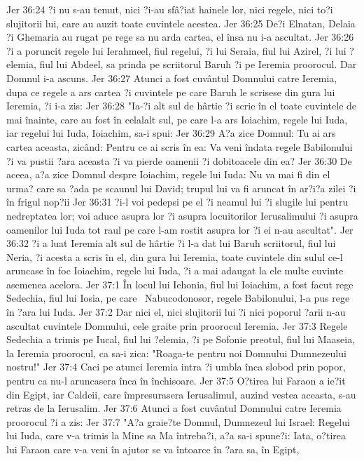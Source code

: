 Jer 36:24  ?i nu s-au temut, nici ?i-au sfâ?iat hainele lor, nici regele, nici to?i slujitorii lui, care au auzit toate cuvintele acestea.
Jer 36:25  De?i Elnatan, Delaia ?i Ghemaria au rugat pe rege sa nu arda cartea, el însa nu i-a ascultat.
Jer 36:26  ?i a poruncit regele lui Ierahmeel, fiul regelui, ?i lui Seraia, fiul lui Azirel, ?i lui ?elemia, fiul lui Abdeel, sa prinda pe scriitorul Baruh ?i pe Ieremia proorocul. Dar Domnul i-a ascuns.
Jer 36:27  Atunci a fost cuvântul Domnului catre Ieremia, dupa ce regele a ars cartea ?i cuvintele pe care Baruh le scrisese din gura lui Ieremia, ?i i-a zis:
Jer 36:28  "Ia-?i alt sul de hârtie ?i scrie în el toate cuvintele de mai înainte, care au fost în celalalt sul, pe care l-a ars Ioiachim, regele lui Iuda, iar regelui lui Iuda, Ioiachim, sa-i spui:
Jer 36:29  A?a zice Domnul: Tu ai ars cartea aceasta, zicând: Pentru ce ai scris în ea: Va veni îndata regele Babilonului ?i va pustii ?ara aceasta ?i va pierde oamenii ?i dobitoacele din ea?
Jer 36:30  De aceea, a?a zice Domnul despre Ioiachim, regele lui Iuda: Nu va mai fi din el urma? care sa ?ada pe scaunul lui David; trupul lui va fi aruncat în ar?i?a zilei ?i în frigul nop?ii
Jer 36:31  ?i-l voi pedepsi pe el ?i neamul lui ?i slugile lui pentru nedreptatea lor; voi aduce asupra lor ?i asupra locuitorilor Ierusalimului ?i asupra oamenilor lui Iuda tot raul pe care l-am rostit asupra lor ?i ei n-au ascultat".
Jer 36:32  ?i a luat Ieremia alt sul de hârtie ?i l-a dat lui Baruh scriitorul, fiul lui Neria, ?i acesta a scris în el, din gura lui Ieremia, toate cuvintele din sulul ce-l aruncase în foc Ioiachim, regele lui Iuda, ?i a mai adaugat la ele multe cuvinte asemenea acelora.
Jer 37:1  În locul lui Iehonia, fiul lui Ioiachim, a fost facut rege Sedechia, fiul lui Iosia, pe care  Nabucodonosor, regele Babilonului, l-a pus rege în ?ara lui Iuda.
Jer 37:2  Dar nici el, nici slujitorii lui ?i nici poporul ?arii n-au ascultat cuvintele Domnului, cele graite prin proorocul Ieremia.
Jer 37:3  Regele Sedechia a trimis pe Iucal, fiul lui ?elemia, ?i pe Sofonie preotul, fiul lui Maaseia, la Ieremia proorocul, ca sa-i zica: "Roaga-te pentru noi Domnului Dumnezeului nostru!"
Jer 37:4  Caci pe atunci Ieremia intra ?i umbla înca slobod prin popor, pentru ca nu-l aruncasera înca în închisoare.
Jer 37:5  O?tirea lui Faraon a ie?it din Egipt, iar Caldeii, care împresurasera Ierusalimul, auzind vestea aceasta, s-au retras de la Ierusalim.
Jer 37:6  Atunci a fost cuvântul Domnului catre Ieremia proorocul ?i a zis:
Jer 37:7  "A?a graie?te Domnul, Dumnezeul lui Israel: Regelui lui Iuda, care v-a trimis la Mine sa Ma întreba?i, a?a sa-i spune?i: Iata, o?tirea lui Faraon care v-a veni în ajutor se va întoarce în ?ara sa, în Egipt,
